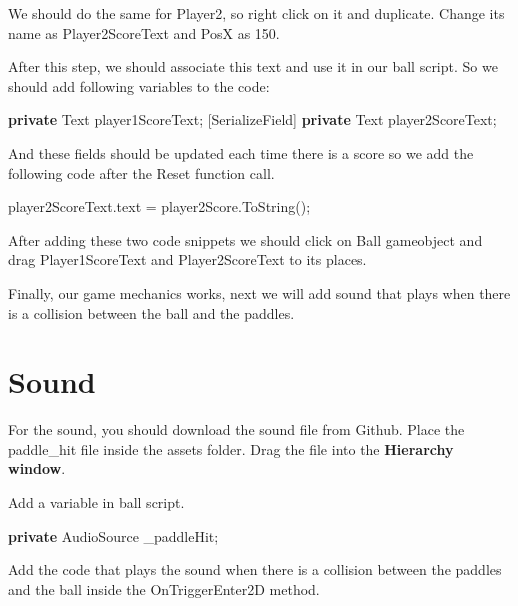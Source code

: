 \documentclass[
]{book}
\newenvironment{Shaded}{\begin{snugshade}}{\end{snugshade}}
\newcommand{\FunctionTok}[1]{\textcolor[rgb]{0.00,0.00,0.00}{#1}}
\newcommand{\KeywordTok}[1]{\textcolor[rgb]{0.13,0.29,0.53}{\textbf{#1}}}
\newcommand{\NormalTok}[1]{#1}
\begin{document}
We should do the same for Player2, so right click on it and duplicate. Change its name as Player2ScoreText and PosX as 150.

After this step, we should associate this text and use it in our ball script. So we should add following variables to the code:

\begin{Shaded}
\begin{Highlighting}[]
\NormalTok{[SerializeField] }\KeywordTok{private}\NormalTok{ Text player1ScoreText;}
\NormalTok{[SerializeField] }\KeywordTok{private}\NormalTok{ Text player2ScoreText;}
\end{Highlighting}
\end{Shaded}

And these fields should be updated each time there is a score so we add the following code after the Reset function call.

\begin{Shaded}
\begin{Highlighting}[]
\NormalTok{player2ScoreText.}\FunctionTok{text}\NormalTok{ =  player2Score.}\FunctionTok{ToString}\NormalTok{();}
\end{Highlighting}
\end{Shaded}

After adding these two code snippets we should click on Ball gameobject and drag Player1ScoreText and Player2ScoreText to its places.

Finally, our game mechanics works, next we will add sound that plays when there is a collision between the ball and the paddles.

\hypertarget{sound}{%
\section{Sound}\label{sound}}

For the sound, you should download the sound file from Github. Place the paddle\_hit file inside the assets folder. Drag the file into the \textbf{Hierarchy window}.

Add a variable in ball script.

\begin{Shaded}
\begin{Highlighting}[]
\NormalTok{[SerializeField] }\KeywordTok{private}\NormalTok{ AudioSource _paddleHit;}
\end{Highlighting}
\end{Shaded}

Add the code that plays the sound when there is a collision between the paddles and the ball inside the OnTriggerEnter2D method.
\end{document}
